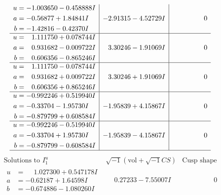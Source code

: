 \documentclass[1p]{elsarticle_modified}
\theoremstyle{definition}
\newcommand{\I}{\sqrt{-1}}
\begin{document}
$$\begin{array}{c|c|c}
\begin{aligned}
u &= -1.003650 - 0.458888 I \\
a &= -0.56877 + 1.84841 I \\
b &= -1.42816 - 0.42370 I\end{aligned}
 & -2.91315 - 4.52729 I & \phantom{-0.000000 } 0 \\ \hline\begin{aligned}
u &= \phantom{-}1.111750 + 0.078744 I \\
a &= \phantom{-}0.931682 - 0.009722 I \\
b &= \phantom{-}0.606356 - 0.865246 I\end{aligned}
 & \phantom{-}3.30246 - 1.91069 I & \phantom{-0.000000 } 0 \\ \hline\begin{aligned}
u &= \phantom{-}1.111750 - 0.078744 I \\
a &= \phantom{-}0.931682 + 0.009722 I \\
b &= \phantom{-}0.606356 + 0.865246 I\end{aligned}
 & \phantom{-}3.30246 + 1.91069 I & \phantom{-0.000000 } 0 \\ \hline\begin{aligned}
u &= -0.992246 + 0.519940 I \\
a &= -0.33704 - 1.95730 I \\
b &= -0.879799 + 0.608584 I\end{aligned}
 & -1.95839 + 4.15867 I & \phantom{-0.000000 } 0 \\ \hline\begin{aligned}
u &= -0.992246 - 0.519940 I \\
a &= -0.33704 + 1.95730 I \\
b &= -0.879799 - 0.608584 I\end{aligned}
 & -1.95839 - 4.15867 I & \phantom{-0.000000 } 0\\
 \hline 
 \end{array}$$\newpage$$\begin{array}{c|c|c}  
\text{Solutions to }I^u_{1}& \I (\text{vol} + \sqrt{-1}CS) & \text{Cusp shape}\\
 \hline 
\begin{aligned}
u &= \phantom{-}1.027300 + 0.547178 I \\
a &= -0.62187 + 1.64598 I \\
b &= -0.674886 - 1.080260 I\end{aligned}
 & \phantom{-}0.27233 - 7.55007 I & \phantom{-0.000000 } 0 \\ \hline\begin{aligned}

\end{aligned}
\end{array}$$
\end{document}
